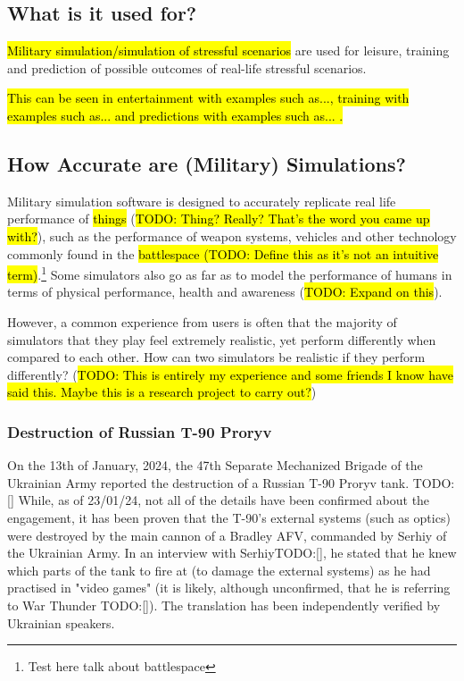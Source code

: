 \documentclass{article}
\begin{document}


\subsection{What is it used for?}

\hl{Military simulation/simulation of stressful scenarios} are used for leisure, training and prediction of possible outcomes of real-life stressful scenarios.

\hl{This can be seen in entertainment with examples such as..., training with examples such as... and predictions with examples such as... .}

\subsection{How Accurate are (Military) Simulations?}

Military simulation software is designed to accurately replicate real life performance of \hl{things} (\hl{TODO: Thing? Really? That's the word you came up with?}), such as the performance of weapon systems, vehicles and other technology commonly found in the \hl{battlespace (TODO: Define this as it's not an intuitive term)}.\footnote{Test here talk about battlespace} Some simulators also go as far as to model the performance of humans in terms of physical performance, health and awareness (\hl{TODO: Expand on this}).

However, a common experience from users is often that the majority of simulators that they play feel extremely realistic, yet perform differently when compared to each other. How can two simulators be realistic if they perform differently? (\hl{TODO: This is entirely my experience and some friends I know have said this. Maybe this is a research project to carry out?})

\subsubsection{Destruction of Russian T-90 Proryv}

On the 13th of January, 2024, the 47th Separate Mechanized Brigade of the Ukrainian Army reported the destruction of a Russian T-90 Proryv tank. TODO: [] While, as of 23/01/24, not all of the details have been confirmed about the engagement, it has been proven that the T-90's external systems (such as optics) were destroyed by the main cannon of a Bradley AFV, commanded by Serhiy of the Ukrainian Army. In an interview with SerhiyTODO:[], he stated that he knew which parts of the tank to fire at (to damage the external systems) as he had practised in "video games" (it is likely, although unconfirmed, that he is referring to War Thunder TODO:[]). The translation has been independently verified by Ukrainian speakers.
\end{document}
